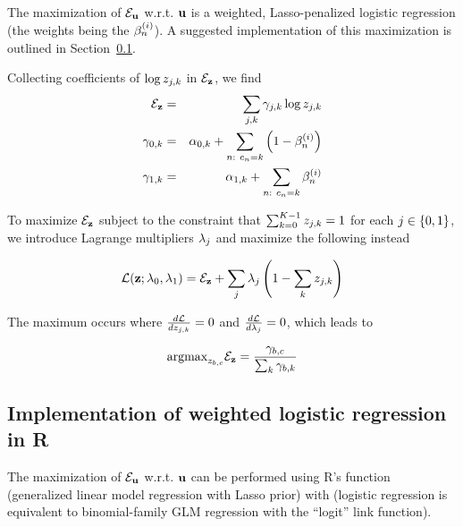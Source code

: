 \documentclass{article}
\begin{document}
The maximization of ${\cal E}_{{\bf u}}$ w.r.t. ${\bf u}$ is a weighted, Lasso-penalized logistic regression
(the weights being the $\beta^{(i )}_{n}$).
A suggested implementation of this maximization is outlined in Section~\ref{sec:WeightedLogisticRegression}.

Collecting coefficients of $\log z_{j,k}$ in ${\cal E}_{{\bf z}}$, we find
\begin{eqnarray*}
  \emobjective_{\labelerrprobs} & = & \sum_{\binlabelindex,\catlabelindex} \labelerrsum_{\binlabelindex,\catlabelindex} \log \labelerrprob_{\binlabelindex,\catlabelindex} \\
  \labelerrsum_{0,\catlabelindex} & = & \pseudocount_{0,\catlabelindex} + \sum_{\datapoint:\ \catlabel_{\datapoint} = \catlabelindex} \left( 1 - \postprob \right) \\
  \labelerrsum_{1,\catlabelindex} & = & \pseudocount_{1,\catlabelindex} + \sum_{\datapoint:\ \catlabel_{\datapoint} = \catlabelindex} \postprob
\end{eqnarray*}

To maximize ${\cal E}_{{\bf z}}$ subject to the constraint that $\sum_{k=0}^{K-1} z_{j,k} = 1$ for each $j \in \{0,1\}$,
we introduce Lagrange multipliers $\lambda_{j}$ and maximize the following instead

\[
{\cal L}({\bf z};\lambda_0,\lambda_1) = {\cal E}_{{\bf z}} + \sum_{j} \lambda_j \left( 1 - \sum_{k} z_{j,k} \right)
\]

The maximum occurs where $\frac{d{\cal L}}{dz_{j,k}} = 0$ and
$\frac{d{\cal L}}{d\lambda_{j}} = 0$, which leads to

\[
\mbox{argmax}_{z_{b,c}} {\cal E}_{{\bf z}} = \frac{\gamma_{b,c}}{\sum_{k} \gamma_{b,k} }
\]


\subsection{Implementation of weighted logistic regression in R}
\label{sec:WeightedLogisticRegression}

The maximization of ${\cal E}_{{\bf u}}$ w.r.t. ${\bf u}$ can be performed using R's  function (generalized linear model regression with Lasso prior)
with 
(logistic regression is equivalent to binomial-family GLM regression with the ``logit'' link function).
\end{document}
